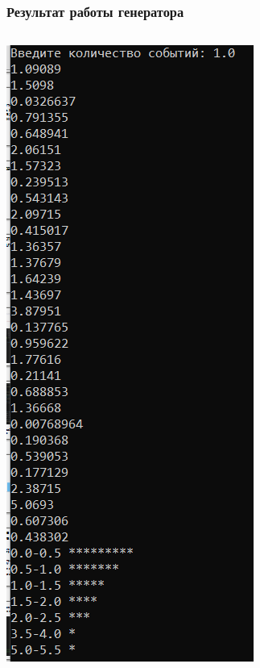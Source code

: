 \documentclass{beamer}
\begin{document}
\begin{frame}
\frametitle{Результат работы генератора}
\begin{columns}[t]
\begin{column}{0.25\textwidth}
\includegraphics[width=\textwidth]{exp_dist1.png}

\end{column}
\end{columns}
\end{frame}
\end{document}
